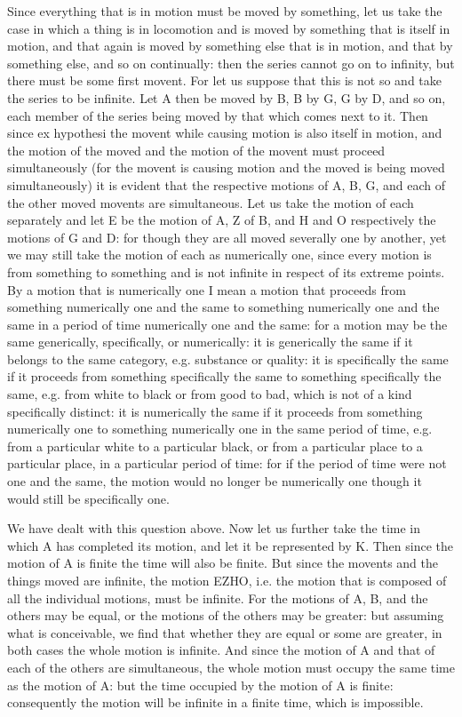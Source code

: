 Since everything that is in motion must be moved by something, let
us take the case in which a thing is in locomotion and is moved by
something that is itself in motion, and that again is moved by something
else that is in motion, and that by something else, and so on continually:
then the series cannot go on to infinity, but there must be some first
movent. For let us suppose that this is not so and take the series
to be infinite. Let A then be moved by B, B by G, G by D, and so on,
each member of the series being moved by that which comes next to
it. Then since ex hypothesi the movent while causing motion is also
itself in motion, and the motion of the moved and the motion of the
movent must proceed simultaneously (for the movent is causing motion
and the moved is being moved simultaneously) it is evident that the
respective motions of A, B, G, and each of the other moved movents
are simultaneous. Let us take the motion of each separately and let
E be the motion of A, Z of B, and H and O respectively the motions
of G and D: for though they are all moved severally one by another,
yet we may still take the motion of each as numerically one, since
every motion is from something to something and is not infinite in
respect of its extreme points. By a motion that is numerically one
I mean a motion that proceeds from something numerically one and the
same to something numerically one and the same in a period of time
numerically one and the same: for a motion may be the same generically,
specifically, or numerically: it is generically the same if it belongs
to the same category, e.g. substance or quality: it is specifically
the same if it proceeds from something specifically the same to something
specifically the same, e.g. from white to black or from good to bad,
which is not of a kind specifically distinct: it is numerically the
same if it proceeds from something numerically one to something numerically
one in the same period of time, e.g. from a particular white to a
particular black, or from a particular place to a particular place,
in a particular period of time: for if the period of time were not
one and the same, the motion would no longer be numerically one though
it would still be specifically one. 

We have dealt with this question above. Now let us further take the
time in which A has completed its motion, and let it be represented
by K. Then since the motion of A is finite the time will also be finite.
But since the movents and the things moved are infinite, the motion
EZHO, i.e. the motion that is composed of all the individual motions,
must be infinite. For the motions of A, B, and the others may be equal,
or the motions of the others may be greater: but assuming what is
conceivable, we find that whether they are equal or some are greater,
in both cases the whole motion is infinite. And since the motion of
A and that of each of the others are simultaneous, the whole motion
must occupy the same time as the motion of A: but the time occupied
by the motion of A is finite: consequently the motion will be infinite
in a finite time, which is impossible. 

